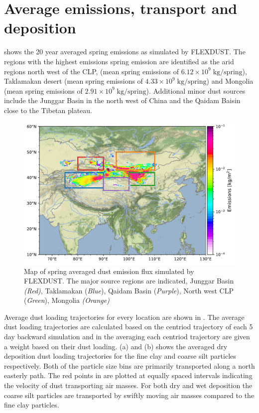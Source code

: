 \section{Average emissions, transport and deposition}
 shows the 20 year averaged spring emissions as simulated by FLEXDUST. The regions with the highest emissions spring emission are identified as the arid regions north west of the CLP,  (mean spring emissions of $6.12\times 10^9\; \si{\kg}/ \mathrm{spring}$), Taklamakan desert (mean spring emissions of $4.33\times 10^9\; \si{\kg} / \mathrm{spring}$) and Mongolia (mean spring emissions of $2.91\times 10^9\; \si{\kg} / \mathrm{spring}$). Additional minor dust sources include the Junggar Basin in the north west of China and the Qaidam Baisin close to the Tibetan plateau.  
\begin{figure}[hptb]
    \centering
    \includegraphics[width=\textwidth]{../figs/emission_map_1999_2019.pdf}
    \caption{Map of spring averaged dust emission flux simulated by FLEXDUST. The major source regions are indicated,  Junggar Basin \emph{(Red)},  Taklamakan (\emph{Blue}),  Qaidam Basin (\emph{Purple}), North west CLP (\emph{Green}),  Mongolia \emph{(Orange)}}
    \label{fig:emission_map_flexdust}
\end{figure}
Average dust loading trajectories for every location are shown in . The average dust loading trajectories are calculated based on the centriod trajectory of each 5 day backward simulation and in the averaging each centriod trajectory are given a weight based on their dust loading.   (a) and (b) shows the averaged dry deposition dust loading trajectories for the fine clay and coarse silt particles respectively. Both of the particle size bins are primarily transported along a north easterly path. The red points in  are plotted at equally spaced intervals indicating the velocity of dust transporting air masses. For both dry and wet deposition the coarse silt particles are transported by swiftly moving air masses compared to the fine clay particles.     
